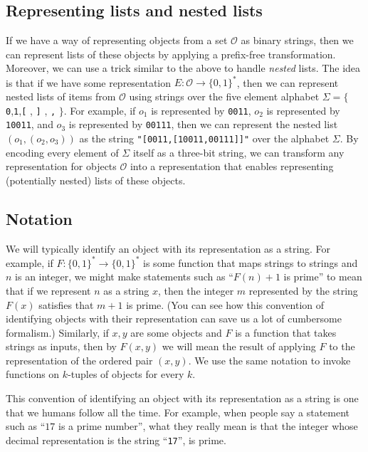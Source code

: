 \subsection{Representing lists and nested
lists}\label{Representing-lists-and-ne}

If we have a way of representing objects from a set \(\mathcal{O}\) as
binary strings, then we can represent lists of these objects by applying
a prefix-free transformation. Moreover, we can use a trick similar to
the above to handle \emph{nested} lists. The idea is that if we have
some representation \(E:\mathcal{O} \rightarrow \{0,1\}^*\), then we can
represent nested lists of items from \(\mathcal{O}\) using strings over
the five element alphabet \(\Sigma = \{\)
\texttt{0},\texttt{1},\texttt{[} , \texttt{]} , \texttt{,} \(\}\). For
example, if \(o_1\) is represented by \texttt{0011}, \(o_2\) is
represented by \texttt{10011}, and \(o_3\) is represented by
\texttt{00111}, then we can represent the nested list
\((o_1,(o_2,o_3))\) as the string \texttt{"[0011,[10011,00111]]"} over
the alphabet \(\Sigma\). By encoding every element of \(\Sigma\) itself
as a three-bit string, we can transform any representation for objects
\(\mathcal{O}\) into a representation that enables representing
(potentially nested) lists of these objects.

\subsection{Notation}\label{Notation}

We will typically identify an object with its representation as a
string. For example, if \(F:\{0,1\}^* \rightarrow \{0,1\}^*\) is some
function that maps strings to strings and \(n\) is an integer, we might
make statements such as ``\(F(n)+1\) is prime'' to mean that if we
represent \(n\) as a string \(x\), then the integer \(m\) represented by
the string \(F(x)\) satisfies that \(m+1\) is prime. (You can see how
this convention of identifying objects with their representation can
save us a lot of cumbersome formalism.) Similarly, if \(x,y\) are some
objects and \(F\) is a function that takes strings as inputs, then by
\(F(x,y)\) we will mean the result of applying \(F\) to the
representation of the ordered pair \((x,y)\). We use the same notation
to invoke functions on \(k\)-tuples of objects for every \(k\).

This convention of identifying an object with its representation as a
string is one that we humans follow all the time. For example, when
people say a statement such as ``\(17\) is a prime number'', what they
really mean is that the integer whose decimal representation is the
string ``\texttt{17}'', is prime.

